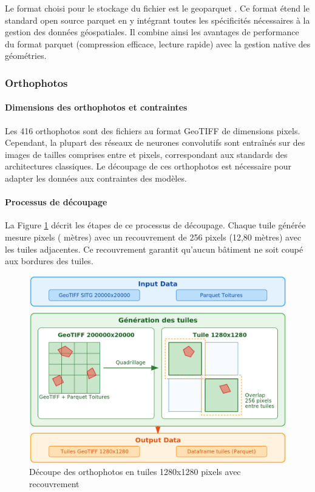 Le format choisi pour le stockage du fichier est le geoparquet \cite{noauthor_geoparquet_nodate}. Ce format étend le standard open source parquet \cite{noauthor_parquet_nodate} en y intégrant toutes les spécificités nécessaires à la gestion des données géospatiales. Il combine ainsi les avantages de performance du format parquet (compression efficace, lecture rapide) avec la gestion native des géométries.

\newpage
\subsubsection{Orthophotos}
\label{subsubsec:decoupe_orthophoto_tuile}

\paragraph{Dimensions des orthophotos et contraintes}
Les 416 orthophotos sont des fichiers au format GeoTIFF de dimensions \si{} pixels. Cependant, la plupart des réseaux de neurones convolutifs sont entraînés sur des images de tailles comprises entre \si{} et \si{} pixels, correspondant aux standards des architectures classiques. Le découpage de ces orthophotos est nécessaire pour adapter les données aux contraintes des modèles.

\paragraph{Processus de découpage}
La Figure \ref{fig:ch3_preparation_donnees_orthophotos_01_etl} décrit les étapes de ce processus de découpage. Chaque tuile générée mesure \si{} pixels (\si{} mètres) avec un recouvrement de 256 pixels (12,80 mètres) avec les tuiles adjacentes. Ce recouvrement garantit qu'aucun bâtiment ne soit coupé aux bordures des tuiles.
\begin{figure}[H]
    \centering
    \includegraphics[width=1\linewidth]{02-main/figures/ch3/ch3_preparation_donnees_orthophotos_01_etl.png}
    \caption{Découpe des orthophotos en tuiles 1280x1280 pixels avec recouvrement}
    \label{fig:ch3_preparation_donnees_orthophotos_01_etl}
\end{figure}

